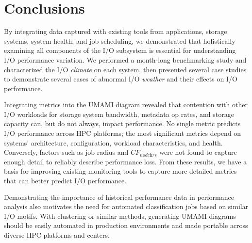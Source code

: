 \section{Conclusions} \label{sec:conclusions}

By integrating data captured with existing tools from applications, storage systems, system health, and job scheduling, we demonstrated that holistically examining all components of the I/O subsystem is essential for understanding I/O performance variation.
We performed a month-long benchmarking study and characterized the I/O \emph{climate} on each system, then presented several case studies to demonstrate several cases of abnormal I/O \emph{weather} and their effects on I/O performance.

Integrating metrics into the UMAMI diagram revealed that contention with other I/O workloads for storage system bandwidth, metadata op rates, and storage capacity can, but do not always, impact performance.
No single metric predicts I/O performance across HPC platforms;
the most significant metrics depend on systems' architecture, configuration, workload characteristics, and health.
Conversely, factors such as job radius and $\textit{CF}_{\textit{nodehrs}}$ were not found to capture enough detail to reliably describe performance loss.
From these results, we have a basis for improving existing monitoring tools to capture more detailed metrics that can better predict I/O performance.

Demonstrating the importance of historical performance data in performance analysis also motivates the need for automated classification jobs based on similar I/O motifs.  With  clustering or similar methods, generating UMAMI diagrams should be easily automated in production environments and made portable across diverse HPC platforms and centers.